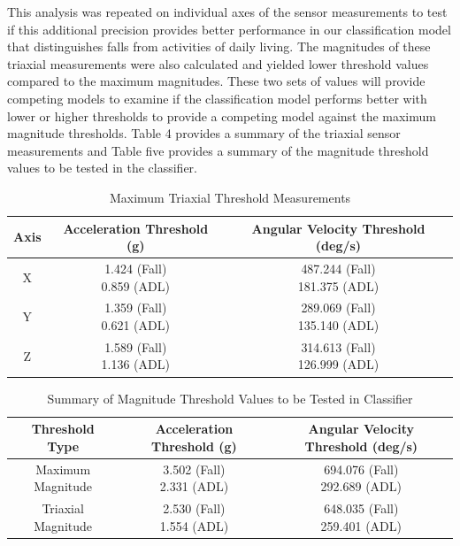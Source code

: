 \documentclass{llncs}
\begin{document}
	This analysis was repeated on individual axes of the sensor measurements to test if this additional precision provides better performance in our classification model that distinguishes falls from activities of daily living. The magnitudes of these triaxial measurements were also calculated and yielded lower threshold values compared to the maximum magnitudes. These two sets of values will provide competing models to examine if the classification model performs better with lower or higher thresholds to provide a competing model against the maximum magnitude thresholds. Table 4 provides a summary of the triaxial sensor measurements and Table five provides a summary of the magnitude threshold values to be tested in the classifier.
	
\begin{table}
	\begin{center}
		\caption{Maximum Triaxial Threshold Measurements}
		\label{table4}
		\begin{tabular}{|c|c|c|}
			\toprule
			Axis & Acceleration Threshold (g) & Angular Velocity Threshold (deg/s)\\
			\midrule
			X & \makecell{1.424 (Fall)\\0.859 (ADL)} & \makecell{487.244 (Fall)\\181.375 (ADL)}\\
			Y & \makecell{1.359 (Fall)\\0.621 (ADL)} & \makecell{289.069 (Fall)\\135.140 (ADL)}\\
			Z & \makecell{1.589 (Fall)\\1.136 (ADL)} & \makecell{314.613 (Fall)\\126.999 (ADL)}\\
			\bottomrule
		\end{tabular}
	\end{center}
\end{table}
	
 \begin{table}
 	\begin{center}
		\caption{Summary of Magnitude Threshold Values to be Tested in Classifier}
		\label{table5}
		\begin{tabular}{|c|c|c|}
			\toprule
			Threshold Type & Acceleration Threshold (g) & Angular Velocity Threshold (deg/s)\\
			\midrule
			Maximum Magnitude & \makecell{3.502 (Fall) \\2.331 (ADL)} & \makecell{694.076 (Fall) \\292.689 (ADL)}\\
			Triaxial Magnitude & \makecell{2.530 (Fall) \\1.554 (ADL)} & \makecell{648.035 (Fall) \\259.401 (ADL)}\\
			\bottomrule
		\end{tabular}
 	\end{center}
\end{table} 
\end{document}
